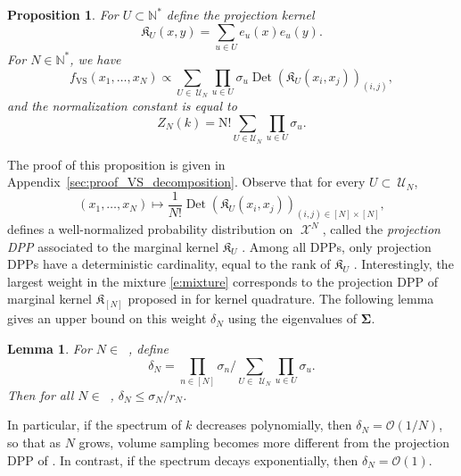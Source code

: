 \documentclass[twoside,11pt]{book}
\newtheorem{proposition}{Proposition}
\newtheorem{lemma}{Lemma}
\numberwithin{theorem}{chapter}
\numberwithin{definition}{chapter}
\numberwithin{proposition}{chapter}
\numberwithin{corollary}{chapter}
\numberwithin{example}{chapter}
\numberwithin{lemma}{chapter}
\DeclareMathOperator{\Det}{Det}
\DeclareMathOperator{\VS}{\mathrm{VS}}
\DeclareMathOperator{\X}{\mathcal{X}}
\DeclareMathOperator{\Ns}{\mathbb{N}^{*}}
\def\UN{\:\mathcal{U}_N}
\begin{document}
\begin{proposition} \label{prop:VS_decomposition}
For $U \subset \mathbb{N}^{*}$ define the projection kernel
\begin{equation}
\mathfrak{K}_{U}(x,y) = \sum\limits_{u \in U} e_{u}(x)e_{u}(y).
\end{equation}
For $N \in \mathbb{N}^{*}$, we have
\begin{equation}
  \label{e:mixture}
f_{\VS}(x_{1}, \dots, x_{N}) \propto \sum\limits_{ U \in \UN} \prod\limits_{u \in U} \sigma_{u} \Det (\mathfrak{K}_{U}(x_{i},x_{j}))_{(i,j)},
\end{equation}
and the normalization constant is equal to
\begin{equation}\label{eq:normalization_constant_VS}
Z_{N}(k) = \mathrm N! \sum\limits_{ U \in \mathcal{U}_{N}} \prod\limits_{u \in U} \sigma_{u}.
\end{equation}
\end{proposition}
The proof of this proposition is given in Appendix~\ref{sec:proof_VS_decomposition}. Observe that
for every $U \subset \UN$,
\begin{equation}
(x_{1}, \dots , x_{N}) \mapsto \frac{1}{N!} \Det (\mathfrak{K}_{U}(x_{i},x_{j}))_{(i,j) \in [N]\times [N] },
\end{equation}
defines a well-normalized probability distribution on $\X^{N}$, called the {\em projection DPP} associated to the marginal kernel $\mathfrak{K}_{U}$  \citep{HoKrPeVi06}. Among all DPPs, only projection DPPs have a deterministic cardinality, equal to the rank of $\mathfrak{K}_{U}$ \citep{HoKrPeVi06}. Interestingly, the largest weight in the mixture \eqref{e:mixture} corresponds to the projection DPP of marginal kernel $\mathfrak{K}_{[N]}$ proposed in \citep{BeBaCh19} for kernel quadrature. The following lemma gives an upper bound on this weight $\delta_N$ using the eigenvalues of $\bm{\Sigma}$.
\begin{lemma}\label{lemma:projection_DPP_weight}
For $N \in \Ns$, define
\begin{equation}
\delta_{N} = \prod\limits_{n \in [N]} \sigma_{n} \bigg/\sum\limits_{ U \in \: \UN} \prod\limits_{u \in U} \sigma_{u}.
\end{equation}
Then for all $N \in \Ns$, $\displaystyle \delta_{N} \leq \sigma_{N} / r_{N}$.
\end{lemma}
In particular, if the spectrum of $k$ decreases polynomially, then $\delta_{N} = \mathcal{O}(1/N)$, so that as $N$ grows, volume sampling becomes more different from the projection DPP of \cite{BeBaCh19}. In contrast, if the spectrum decays exponentially, then $\delta_{N} = \mathcal{O}(1)$.
\end{document}

